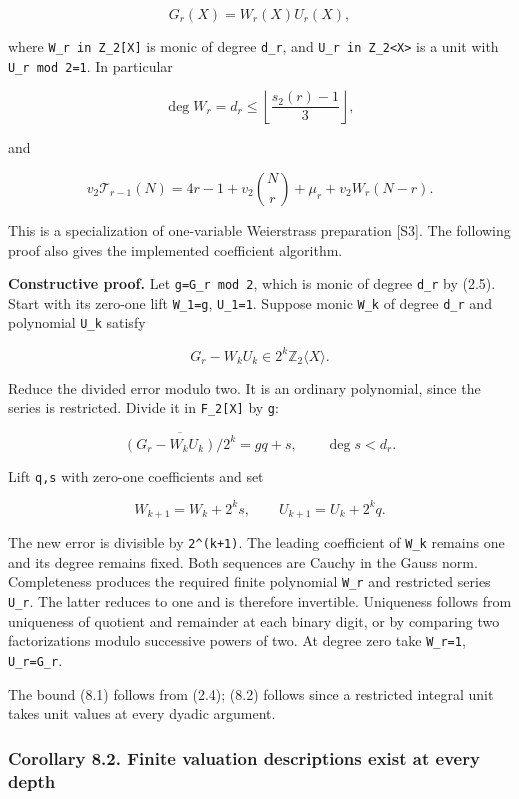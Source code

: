 \documentclass[11pt,letterpaper]{article}
\begin{document}
\[
G_r(X)=W_r(X)U_r(X),
\]

where \texttt{W\_r\ in\ Z\_2{[}X{]}} is monic of degree \texttt{d\_r}, and \texttt{U\_r\ in\ Z\_2\textless{}X\textgreater{}} is a unit with \texttt{U\_r\ mod\ 2=1}. In particular

\[
\boxed{\deg W_r=d_r\le\left\lfloor\frac{s_2(r)-1}{3}\right\rfloor,} \tag{8.1}
\]

and

\[
\boxed{v_2\mathcal T_{r-1}(N)
=4r-1+v_2\binom Nr+\mu_r+v_2W_r(N-r).} \tag{8.2}
\]

This is a specialization of one-variable Weierstrass preparation {[}S3{]}. The following proof also gives the implemented coefficient algorithm.

\textbf{Constructive proof.} Let \texttt{g=G\_r\ mod\ 2}, which is monic of degree \texttt{d\_r} by (2.5). Start with its zero-one lift \texttt{W\_1=g}, \texttt{U\_1=1}. Suppose monic \texttt{W\_k} of degree \texttt{d\_r} and polynomial \texttt{U\_k} satisfy

\[
G_r-W_kU_k\in2^k\mathbb Z_2\langle X\rangle.
\]

Reduce the divided error modulo two. It is an ordinary polynomial, since the series is restricted. Divide it in \texttt{F\_2{[}X{]}} by \texttt{g}:

\[
\overline{(G_r-W_kU_k)/2^k}=gq+s,\qquad\deg s<d_r.
\]

Lift \texttt{q,s} with zero-one coefficients and set

\[
W_{k+1}=W_k+2^ks,\qquad U_{k+1}=U_k+2^kq.
\]

The new error is divisible by \texttt{2\^{}(k+1)}. The leading coefficient of \texttt{W\_k} remains one and its degree remains fixed. Both sequences are Cauchy in the Gauss norm. Completeness produces the required finite polynomial \texttt{W\_r} and restricted series \texttt{U\_r}. The latter reduces to one and is therefore invertible. Uniqueness follows from uniqueness of quotient and remainder at each binary digit, or by comparing two factorizations modulo successive powers of two. At degree zero take \texttt{W\_r=1}, \texttt{U\_r=G\_r}.

The bound (8.1) follows from (2.4); (8.2) follows since a restricted integral unit takes unit values at every dyadic argument.

\subsubsection{Corollary 8.2. Finite valuation descriptions exist at every depth}\label{corollary-8.2.-finite-valuation-descriptions-exist-at-every-depth}
\end{document}
